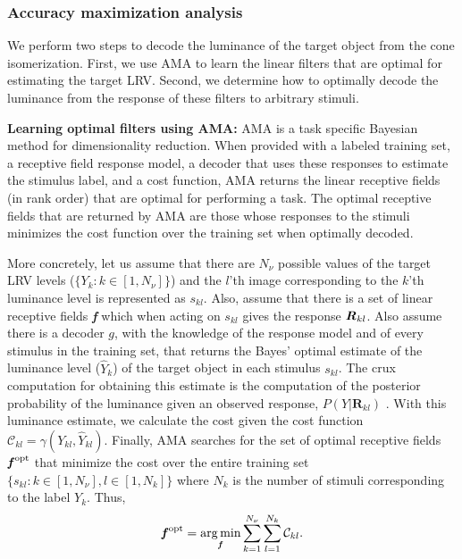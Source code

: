 \documentclass{jov}
\DeclareMathOperator*{\argmin}{arg\,min}
\begin{document}
\subsubsection*{Accuracy maximization analysis}
We perform two steps to decode the luminance of the target object from the cone isomerization. First, we use AMA to learn the linear filters that are optimal for estimating the target LRV. Second, we determine how to optimally decode the luminance from the response of these filters to arbitrary stimuli.

{\bf Learning optimal filters using AMA:} AMA \cite{geisler2009optimal,burge2017accuracy,jaini2017linking}
is a task specific Bayesian method for dimensionality reduction. When provided with a labeled training set, a receptive field response model, a decoder that uses these responses to estimate the stimulus label, and a cost function, AMA returns the linear receptive fields (in rank order) that are optimal for performing a task. The optimal receptive fields that are returned by AMA are those whose responses to the stimuli minimizes the cost function over the training set when optimally decoded. 

More concretely, let us assume that there are $N_{\nu}$ possible values of the target LRV levels ($\{Y_k: k\in[1,N_{\nu}] \}$) and the $l$'th image corresponding to the $k$'th luminance level is represented as $s_{kl}$. Also, assume that there is a set of linear receptive fields {\textbf{\textit f}} which when acting on $s_{kl}$ gives the response ${\textbf{\textit R}}_{kl}$. Also assume there is a decoder $g$, with the knowledge of the response model and of every stimulus in the training set, that returns the Bayes' optimal estimate of the luminance level ($\hat{Y}_k$) of the target object in each stimulus $s_{kl}$. The crux computation for obtaining this estimate is the computation of the posterior probability of the luminance given an observed response, $P(Y|\textbf{R}_{kl})$ \cite{geisler2009optimal,burge2017accuracy,jaini2017linking}
. With this luminance estimate, we calculate the cost given the cost function $\mathcal{C}_{kl} = \gamma(Y_{kl},\hat{Y}_{kl})$. Finally, AMA searches for the set of optimal receptive fields ${\textbf{\textit f}}^{\rm opt}$ that minimize the cost over the entire training set $\{s_{kl}: k\in[1,N_{\nu}], l\in[1,N_k]\}$ where $N_{k}$ is the number of stimuli corresponding to the label $Y_k$. Thus,
\begin{align}
{\textbf {\textit f} }^{\rm opt} = \argmin_{\textbf {\textit f} } \sum_{k=1}^{N_{\nu}}  \sum_{l=1}^{N_k} {\mathcal{C}}_{kl}.
\label{eq:fopt}
\end{align}
\end{document}
